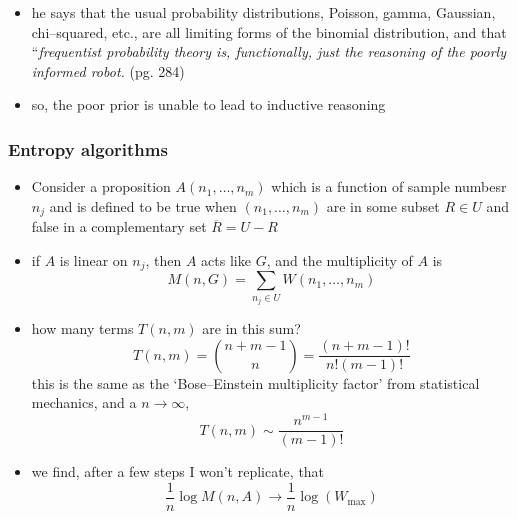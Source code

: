 \documentclass[../jaynes_prob_theory_notes.tex]{subfiles}
\begin{document}
\begin{itemize}
                        \item he says that the usual probability distributions, Poisson, gamma, Gaussian, chi--squared, etc., are all limiting forms of the binomial distribution, and that ``\textit{frequentist probability theory is, functionally, just the reasoning of the poorly informed robot.} (pg. 284)
                        \item so, the poor prior is unable to lead to inductive reasoning
                    \end{itemize}

                \subsubsection{Entropy algorithms}
                    \begin{itemize}
                        \item Consider a proposition $A(n_1, \ldots, n_m)$ which is a function of sample numbesr $n_j$ and is defined to be true when $(n_1, \ldots, n_m)$ are in some subset $R \in U$ and false in a complementary set $\overline{R} = U-R$
                        \item if $A$ is linear on $n_j$, then $A$ acts like $G$, and the multiplicity of $A$ is
                            \begin{equation*}
                                M(n,G) = \sum\limits_{n_j \in U} W(n_1, \ldots, n_m)
                            \end{equation*}
                        \item how many terms $T(n,m)$ are in this sum?
                            \begin{equation*}
                                T(n,m) = \binom{n+m-1}{n} = \frac{(n+m-1)!}{n!(m-1)!}
                            \end{equation*}
                            this is the same as the `Bose--Einstein multiplicity factor' from statistical mechanics, and a $n \rightarrow \infty$,
                            \begin{equation*}
                                T(n,m) \sim \frac{n^{m-1}}{(m-1)!}
                            \end{equation*}
                        \item we find, after a few steps I won't replicate, that
                            \begin{equation*}
                                \frac{1}{n} \log M(n,A) \rightarrow \frac{1}{n} \log (W_{\max})

\end{equation*}
\end{itemize}
\end{document}

